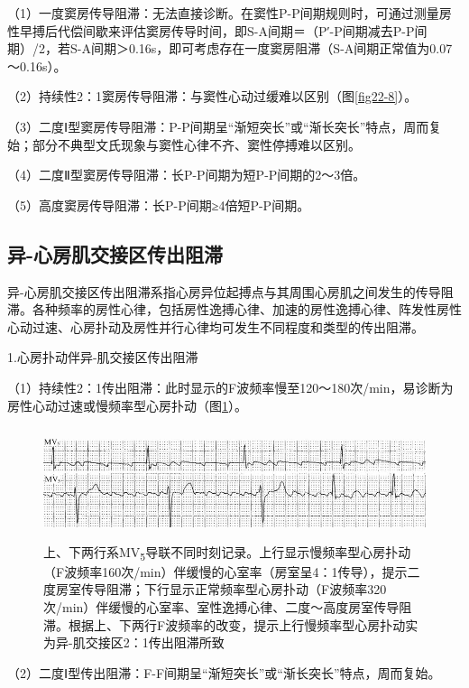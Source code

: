 （1）一度窦房传导阻滞：无法直接诊断。在窦性P-P间期规则时，可通过测量房性早搏后代偿间歇来评估窦房传导时间，即S-A间期＝（P′-P间期减去P-P间期）/2，若S-A间期＞0.16s，即可考虑存在一度窦房阻滞（S-A间期正常值为0.07～0.16s）。

（2）持续性2：1窦房传导阻滞：与窦性心动过缓难以区别（图\ref{fig22-8}）。

（3）二度Ⅰ型窦房传导阻滞：P-P间期呈“渐短突长”或“渐长突长”特点，周而复始；部分不典型文氏现象与窦性心律不齐、窦性停搏难以区别。

（4）二度Ⅱ型窦房传导阻滞：长P-P间期为短P-P间期的2～3倍。

（5）高度窦房传导阻滞：长P-P间期≥4倍短P-P间期。

\protect\hypertarget{text00030.htmlux5cux23subid361}{}{}

\subsection{异-心房肌交接区传出阻滞}

异-心房肌交接区传出阻滞系指心房异位起搏点与其周围心房肌之间发生的传导阻滞。各种频率的房性心律，包括房性逸搏心律、加速的房性逸搏心律、阵发性房性心动过速、心房扑动及房性并行心律均可发生不同程度和类型的传出阻滞。

1.心房扑动伴异-肌交接区传出阻滞

（1）持续性2：1传出阻滞：此时显示的F波频率慢至120～180次/min，易诊断为房性心动过速或慢频率型心房扑动（图\ref{fig23-1}）。

\begin{figure}[!htbp]
 \centering
 \includegraphics[width=5.58333in,height=1.29167in]{./images/Image00385.jpg}
 \captionsetup{justification=centering}
 \caption{上、下两行系MV\textsubscript{5}导联不同时刻记录。上行显示慢频率型心房扑动（F波频率160次/min）伴缓慢的心室率（房室呈4：1传导），提示二度房室传导阻滞；下行显示正常频率型心房扑动（F波频率320次/min）伴缓慢的心室率、室性逸搏心律、二度～高度房室传导阻滞。根据上、下两行F波频率的改变，提示上行慢频率型心房扑动实为异-肌交接区2：1传出阻滞所致}
 \label{fig23-1}
  \end{figure} 


（2）二度Ⅰ型传出阻滞：F-F间期呈“渐短突长”或“渐长突长”特点，周而复始。

